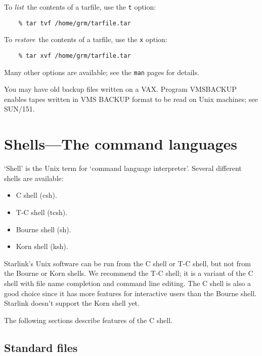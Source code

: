 To {\em list}\, the contents of a tarfile, use the {\tt t} option:
\begin{verbatim}
    % tar tvf /home/grm/tarfile.tar
\end{verbatim}
To {\em restore}\, the contents of a tarfile, use the {\tt x} option:
\begin{verbatim}
    % tar xvf /home/grm/tarfile.tar
\end{verbatim}
Many other options are available; see the {\tt man} pages for details.

You may have old backup files written on a VAX.
Program VMSBACKUP enables tapes written in VMS BACKUP format to be read on
Unix machines; see SUN/151.

\section{Shells---The command languages}

`Shell' is the Unix term for `command language interpreter'.
Several different shells are available:
\begin{itemize}
\item C shell (csh).
\item T-C shell (tcsh).
\item Bourne shell (sh).
\item Korn shell (ksh).
\end{itemize}
Starlink's Unix software can be run from the C shell or T-C shell, but
not from the Bourne or Korn shells.
We recommend the T-C shell; it is a variant of the C shell with file name
completion and command line editing.
The C shell is also a good choice since it has more features for interactive
users than the Bourne shell.
Starlink doesn't support the Korn shell yet.

The following sections describe features of the C shell.

\subsection{Standard files}

